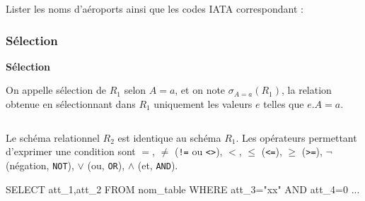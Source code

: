 \documentclass[10pt]{article}
\newif\ifprof
\begin{document}
\begin{exemple}
Lister les noms d'aéroports ainsi que les codes IATA correspondant :

\ifprof
$$
\pi_{\text{name,iata\_code}}(\text{airports})
$$

\begin{envsql}
\begin{sql}
SELECT name,iata_code FROM airports
\end{sql}
\end{envsql}
\else

\vspace{3cm}

\fi
\end{exemple}

\subsubsection{Sélection}
\begin{defi}
\textbf{Sélection}

On appelle sélection de $R_1$ selon $A=a$, et on note $\sigma_{A=a}(R_1)$, la relation obtenue en sélectionnant dans $R_1$ uniquement les valeurs $e$ telles que $e.A = a$.
\ifprof

$$
R_2 \leftarrow \sigma_{\text{attribut}=\text{condition}}(R_1)
$$

\else
$$
\quad
$$
$$
\quad
$$
\fi

Le schéma relationnel $R_2$ est identique au schéma $R_1$.  Les opérateurs permettant d'exprimer une condition sont $=$, $\neq$ (\texttt{!=} ou \texttt{<>}), $<$, $\leq$ (\texttt{<=}), $\geq$ (\texttt{>=}), $\neg$ (négation, \texttt{NOT}), $\vee$ (ou, \texttt{OR}), $\wedge$ (et, \texttt{AND}).

\begin{envsql}
\begin{sql}
SELECT att_1,att_2 FROM nom_table WHERE att_3="xx" AND att_4=0 ...
\end{sql}
\end{envsql}

\end{defi}
\end{document}

